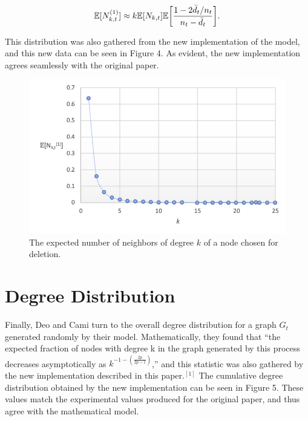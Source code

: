\documentclass[final,3p,times,twocolumn]{elsarticle}
\begin{document}
\begin{equation}
\centering
    \mathbb{E}[N_{k, t}^{(1)}] \approx k\mathbb{E}[N_{k, t}]\mathbb{E}\bigg[\frac{1 - 2\bar{d}_t/n_t}{n_t - \bar{d}_t}\bigg].
\end{equation}

This distribution was also gathered from the new implementation of the model, and this new data can be seen in Figure 4. As evident, the new implementation agrees seamlessly with the original paper.

\begin{figure}[h]
\centering\includegraphics[width=1\linewidth]{degree-distribution.png}
\caption{The expected number of neighbors of degree $k$ of a node chosen for deletion.}
\end{figure}

\section{Degree Distribution}
\label{S:7}

Finally, Deo and Cami turn to the overall degree distribution for a graph $G_t$ generated randomly by their model. Mathematically, they found that “the expected fraction of nodes with degree k in the graph generated by this process decreases asymptotically as $k^{-1 - (\frac{2p}{2p - 1})}$,” and this statistic was also gathered by the new implementation described in this paper.$^{[1]}$ The cumulative degree distribution obtained by the new implementation can be seen in Figure 5. These values match the experimental values produced for the original paper, and thus agree with the mathematical model.
\end{document}
